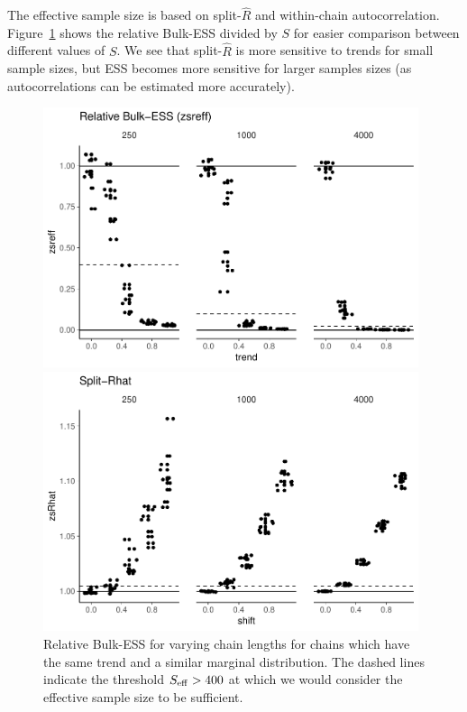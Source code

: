 \documentclass[american,]{article}
\begin{document}
The effective sample size is based on split-\(\widehat{R}\) and
within-chain autocorrelation. Figure~\ref{fig:zsreff-same-trend-1}
shows the relative Bulk-ESS divided by \(S\) for easier
comparison between different values of \(S\).
We see that split-\(\widehat{R}\) is more sensitive to trends for
small sample sizes, but ESS becomes more sensitive for larger samples
sizes (as autocorrelations can be estimated more accurately).
\begin{figure}[tp]
  \centering
  \begin{minipage}{0.48\textwidth}
  \includegraphics[width=0.98\textwidth]{graphics/zsreff-same-trend-1.pdf}
  \caption{Relative Bulk-ESS for varying chain lengths for chains which have
    the same trend and a similar marginal distribution. The dashed
    lines indicate the threshold \(S_{\rm eff} > 400\) at which we
    would consider the effective sample size to be sufficient.}
  \label{fig:zsreff-same-trend-1}
\end{minipage}
\hfill
  \begin{minipage}{0.48\textwidth}
  \includegraphics[width=0.98\textwidth]{graphics/zsrhat-shifted-chain-1.pdf}

\end{minipage}
\end{figure}
\end{document}
